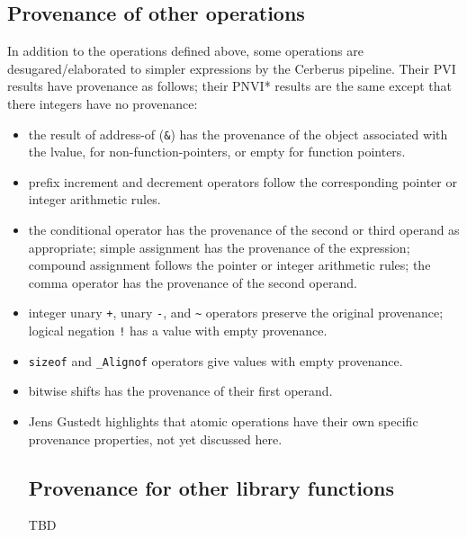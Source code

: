 \documentclass[acmsmall,review,screen]{acmart}\settopmatter{printfolios=true,printccs=false,printacmref=false}
\newenvironment{tightitemize}{

 \begin{itemize}
   \setlength{\itemsep}{0pt}
   \setlength{\parskip}{0pt}
   \setlength{\leftmargin}{0pt}
   \setlength{\leftmargini}{1.5mm}
   \setlength{\leftmarginii}{3mm}
   \setlength{\leftmarginiii}{4.5mm}
   \setlength{\labelwidth}{1.5mm}
   \setlength{\itemindent}{0mm}
   \setlength{\labelsep}{1.5mm}
   \setlength{\rightmargin}{0pt}
   \setlength{\topsep}{0pt}
   \setlength{\parsep}{0pt}}{\end{itemize}
 }
\begin{document}
\subsection{Provenance of other operations}
In addition to the operations defined above, 
some operations are desugared/elaborated to simpler
expressions by the Cerberus pipeline. 
Their PVI results have
provenance  as follows; their PNVI* results are the same except that
there integers have no provenance:
\begin{tightitemize}
  \item
    the result of address-of (\lstinline{&}) has the provenance of the
    object associated with the lvalue, for non-function-pointers, or
  empty for function pointers.
  \item
    prefix increment and decrement operators follow the corresponding pointer or
    integer arithmetic rules.
  \item
    the conditional operator has the provenance of the second or third
    operand as appropriate;
    simple assignment has the provenance of
    the expression; compound assignment follows the pointer or integer
    arithmetic rules; the comma operator has the provenance of
    the second operand.
  \item
    integer unary \lstinline{+}, unary \lstinline{-}, and
    \lstinline{~} operators preserve the original
    provenance; logical negation \lstinline{!} has a value with empty provenance.
  \item
    \lstinline{sizeof} and \lstinline{_Alignof} operators give values with
    empty provenance.
  \item
    bitwise shifts has the provenance of their first operand.

\item
Jens Gustedt highlights that atomic operations have their own specific provenance
properties, not yet discussed here.


\subsection{Provenance for other library functions}
TBD

\end{tightitemize}




\end{document}
